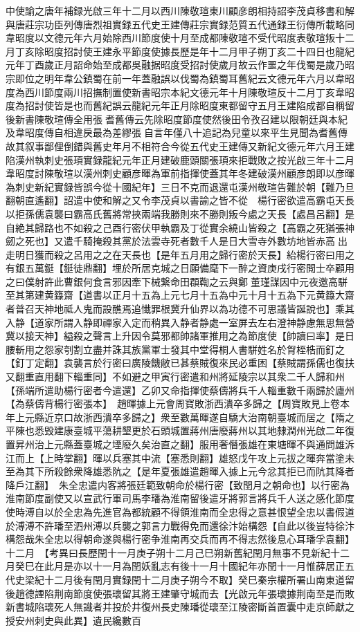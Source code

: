 中使諭之唐年補録光啟三年十二月以西川陳敬瑄東川顧彦朗相持詔李茂貞移書和解與唐莊宗功臣列傳唐烈祖實録五代史王建傳莊宗實録范質五代通録王衍傳所載略同韋昭度以文德元年六月始除西川節度使十月至成都陳敬瑄不受代昭度表敬瑄叛十二月丁亥除昭度招討使王建永平節度使據長歷是年十二月甲子朔丁亥二十四日也龍紀元年丁酉歲正月詔命始至成都吳融据昭度受招討使歲月故云作噩之年伐蜀是歲乃昭宗即位之明年韋公鎮蜀在前一年蓋融誤以伐蜀為鎮蜀耳舊紀云文德元年六月以韋昭度為西川節度兩川招撫制置使新書昭宗本紀文德元年十月陳敬瑄反十二月丁亥韋昭度為招討使皆是也而舊紀誤云龍紀元年正月除昭度東都留守五月王建陷成都自稱留後新書陳敬瑄傳全用張耆舊傳云先除昭度節度使然後田令孜召建以限朝廷與本紀及韋昭度傳自相違戾最為差繆張自言年僅八十追記為兒童以來平生見聞為耆舊傳故其叙事鄙俚倒錯與舊史年月不相符合今從五代史王建傳又新紀文德元年六月王建陷漢州執刺史張頊實録龍紀元年正月建破鹿頭關張頊來拒戰敗之按光啟三年十二月韋昭度討陳敬瑄以漢州刺史顧彦暉為軍前指揮使蓋其年冬建破漢州顧彦朗即以彦暉為刺史新紀實録皆誤今從十國紀年】三日不克而退還屯漢州敬瑄告難於朝【難乃旦翻朝直遙翻】詔遣中使和解之又令李茂貞以書諭之皆不從　楊行密欲遣高霸屯天長以拒孫儒袁襲曰霸高氏舊將常挾兩端我勝則來不勝則叛今處之天長【處昌呂翻】是自絶其歸路也不如殺之己酉行密伏甲執霸及丁從實余繞山皆殺之【高霸之死猶張神劒之死也】又遣千騎掩殺其黨於法雲寺死者數千人是日大雪寺外數坊地皆赤高出走明日獲而殺之呂用之之在天長也【是年五月用之歸行密於天長】紿楊行密曰用之有銀五萬鋌【鋌徒鼎翻】埋於所居克城之日願備麾下一醉之資庚戌行密閲士卒顧用之曰僕射許此曹銀何食言邪因牽下械繋命田頵鞫之云與鄭董瑾謀因中元夜邀高駢至其第建黄籙齋【道書以正月十五為上元七月十五為中元十月十五為下元黄籙大齋者普召天神地祗人鬼而設醮焉追懴罪根冀升仙界以為功德不可思議皆誕說也】乘其入静【道家所謂入静即禪家入定而稍異入静者静處一室屏去左右澄神静慮無思無營冀以接天神】縊殺之聲言上升因令莫邪都帥諸軍推用之為節度使【帥讀曰率】是日腰斬用之怨家刳割立盡并誅其族黨軍士發其中堂得桐人書駢姓名於胷桎梏而釘之【釘丁定翻】袁襲言於行密曰廣陵饑敝已甚蔡賊復來民必重困【蔡賊謂孫儒也復扶又翻重直用翻下輜重同】不如避之甲寅行密遣和州將延陵宗以其衆二千人歸和州【孫端所遣助楊行密者今遣還】乙卯又命指揮使蔡儔將兵千人輜重數千兩歸於廬州【為蔡儔背楊行密張本】　趙暉據上元會周寶敗浙西潰卒多歸之【周寶敗見上卷本年上元縣近京口故浙西潰卒多歸之】衆至數萬暉遂自驕大治南朝臺城而居之【隋之平陳也悉毁建康臺城平蕩耕墾更於石頭城置蔣州唐廢蔣州以其地隸潤州光啟二年復置昇州治上元縣蓋臺城之堙廢久矣治直之翻】服用奢僭張雄在東塘暉不與通問雄泝江而上【上時掌翻】暉以兵塞其中流【塞悉則翻】雄怒戊午攻上元拔之暉奔當塗未至為其下所殺餘衆降雄悉阬之【是年夏張雄遣趙暉入據上元今忿其拒已而阬其降者降戶江翻】　朱全忠遣内客將張廷範致朝命於楊行密【致閏月之朝命也】以行密為淮南節度副使又以宣武行軍司馬李璠為淮南留後遣牙將郭言將兵千人送之感化節度使時溥自以於全忠為先進官為都統顧不得領淮南而全忠得之意甚恨望全忠以書假道於溥溥不許璠至泗州溥以兵襲之郭言力戰得免而還徐汴始構怨【自此以後豈特徐汴構怨哉朱全忠以得朝命遂與楊行密争淮南再交兵而再不得志然後息心耳璠孚袁翻】　十二月　【考異曰長歷閏十一月庚子朔十二月己巳朔新舊紀閏月無事不見新紀十二月癸巳在此月是亦以十一月為閏妖亂志有後十一月十國紀年亦閏十一月惟薛居正五代史梁紀十二月後有閏月實録閏十二月庚子朔今不取】癸巳秦宗權所署山南東道留後趙德諲陷荆南節度使張瓌留其將王建肇守城而去【光啟元年張瓌據荆南至是而敗新書城陷瓌死人無識者并投於井復州長史陳璠從瓌至江陵密斷首置囊中走京師獻之授安州刺史與此異】遺民纔數百